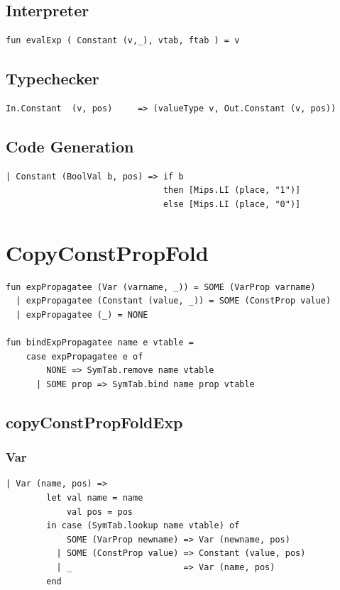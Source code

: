 \documentclass[11pt]{article}
\begin{document}
    \subsection{Interpreter}
    \begin{lstlisting}[basicstyle=\small]
fun evalExp ( Constant (v,_), vtab, ftab ) = v
    \end{lstlisting}

    \subsection{Typechecker}
    \begin{lstlisting}[basicstyle=\small]
In.Constant  (v, pos)     => (valueType v, Out.Constant (v, pos))
    \end{lstlisting}

    \subsection{Code Generation}
    \begin{lstlisting}[basicstyle=\small]
| Constant (BoolVal b, pos) => if b
                               then [Mips.LI (place, "1")]
                               else [Mips.LI (place, "0")]
    \end{lstlisting}

	\section{CopyConstPropFold} \label{CopyConstPropFold}
	\begin{lstlisting}[basicstyle=\small]
fun expPropagatee (Var (varname, _)) = SOME (VarProp varname)
  | expPropagatee (Constant (value, _)) = SOME (ConstProp value)
  | expPropagatee (_) = NONE

fun bindExpPropagatee name e vtable =
    case expPropagatee e of
        NONE => SymTab.remove name vtable
      | SOME prop => SymTab.bind name prop vtable
	\end{lstlisting}
	\subsection{copyConstPropFoldExp} \label{copyConstPropFoldExp}
	\subsubsection{Var} \label{ccpfvar}
	\begin{lstlisting}[basicstyle=\small]
      | Var (name, pos) =>
        let val name = name
            val pos = pos
        in case (SymTab.lookup name vtable) of
            SOME (VarProp newname) => Var (newname, pos)
          | SOME (ConstProp value) => Constant (value, pos)
          | _                      => Var (name, pos)
        end
    \end{lstlisting}
\end{document}
